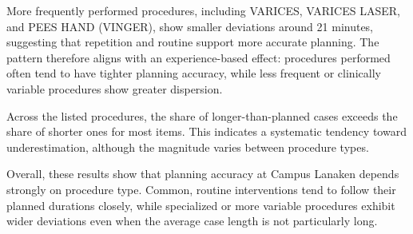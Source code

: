 \documentclass[
]{article}
\begin{document}
More frequently performed procedures, including VARICES, VARICES LASER,
and PEES HAND (VINGER), show smaller deviations around 21 minutes,
suggesting that repetition and routine support more accurate planning.
The pattern therefore aligns with an experience-based effect: procedures
performed often tend to have tighter planning accuracy, while less
frequent or clinically variable procedures show greater dispersion.

Across the listed procedures, the share of longer-than-planned cases
exceeds the share of shorter ones for most items. This indicates a
systematic tendency toward underestimation, although the magnitude
varies between procedure types.

Overall, these results show that planning accuracy at Campus Lanaken
depends strongly on procedure type. Common, routine interventions tend
to follow their planned durations closely, while specialized or more
variable procedures exhibit wider deviations even when the average case
length is not particularly long.
\end{document}
